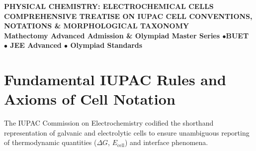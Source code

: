 \documentclass[10pt,a4paper]{article}
\begin{document}
\begin{center}
    {\color{primary}\Large\bfseries PHYSICAL CHEMISTRY: ELECTROCHEMICAL CELLS}\\[3pt]
    {\color{secondary}\small\bfseries COMPREHENSIVE TREATISE ON IUPAC CELL CONVENTIONS, NOTATIONS \& MORPHOLOGICAL TAXONOMY}\\[3pt]
    {\footnotesize\color{gray}\textbf{Mathectomy Advanced Admission \& Olympiad Master Series \quad$\bullet$\quad BUET $\bullet$ JEE Advanced $\bullet$ Olympiad Standards}}
\end{center}
\vspace{-2pt}

\begin{abstract}
\noindent This monograph presents the formal IUPAC (International Union of Pure and Applied Chemistry) standards governing electrochemical cell notation, boundary typologies, and half-cell representations. Every standard, non-standard, and unconventional electrochemical system---spanning metal--ion, insoluble salt, gas, soluble redox, amalgam, insoluble oxide, concentration, membrane/ion-selective, organic redox, and solid-state/molten systems---is cataloged. Crucially, each representation is dissected via a microscopic, bit-by-bit anatomical parsing that explicitly links every vertical line, comma, phase marker, concentration term, and electrode conductor to its underlying IUPAC mandate, accompanied by complete half-cell/net chemical reactions and a graded practice corpus.
\end{abstract}

\vspace{-2pt}
\tableofcontents
\newpage

\section{Fundamental IUPAC Rules and Axioms of Cell Notation}

The IUPAC Commission on Electrochemistry codified the shorthand representation of galvanic and electrolytic cells to ensure unambiguous reporting of thermodynamic quantities ($\Delta G$, $E_{\text{cell}}$) and interface phenomena.
\end{document}
